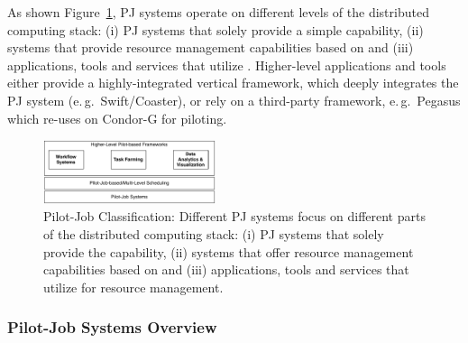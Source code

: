 \documentclass{sig-alternate}
\begin{document}
As shown Figure~\ref{fig:figures_classification}, PJ systems operate on
different levels of the distributed computing stack: (i) PJ systems that
solely provide a simple \pilot capability, (ii) systems that provide resource
management capabilities based on \pilots and (iii) applications, tools and
services that utilize \pilots. Higher-level applications and tools either 
provide a highly-integrated vertical framework, which deeply integrates the PJ 
system (e.\,g.\ Swift/Coaster), or rely on a third-party 
\pilotjob framework, e.\,g.\ Pegasus which re-uses on Condor-G for piloting.

\begin{figure}[t]
	\centering
		\includegraphics[width=0.45\textwidth]{figures/classification.pdf}
	\caption{Pilot-Job Classification: 	Different PJ systems focus on 
	different parts of the distributed computing stack: (i) PJ systems that 
	solely provide the \pilot capability, (ii) systems that offer resource 
	management capabilities based on \pilots and (iii) applications, tools and 
	services that utilize \pilots for resource management.}
	\label{fig:figures_classification}
\end{figure}


\subsubsection*{Pilot-Job Systems Overview}
\end{document}
